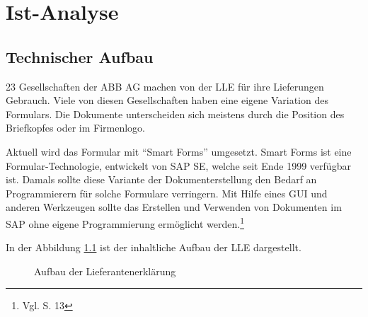 \chapter{Ist-Analyse}
\label{ch:Ist-Analyse}


	
	\section{Technischer Aufbau}
	\label{ch:ist-aufbau}
	23 Gesellschaften der \ac{ABB} AG machen von der \ac{LLE} für ihre Lieferungen Gebrauch. Viele von diesen Gesellschaften haben eine eigene Variation des Formulars. Die Dokumente unterscheiden sich meistens durch die Position des Briefkopfes oder im Firmenlogo. 
	
	Aktuell wird das Formular mit "`Smart Forms"' umgesetzt. Smart Forms ist eine Formular-Technologie, entwickelt von SAP SE, welche seit Ende 1999 verfügbar ist. Damals sollte diese Variante der Dokumenterstellung den Bedarf an Programmierern für solche Formulare verringern. Mit Hilfe eines \ac{GUI} und anderen Werkzeugen sollte das Erstellen und Verwenden von Dokumenten im SAP ohne eigene Programmierung ermöglicht werden.\footnote{Vgl. \cite{Hertleif.2003} S. 13}  
	
	In der Abbildung \ref{AufLLE} ist der inhaltliche Aufbau der \ac{LLE} dargestellt. 
	\begin{figure}[ht]
		\centering
		\caption{Aufbau der Lieferantenerklärung}
		\label{AufLLE}
		
	\end{figure}
	
